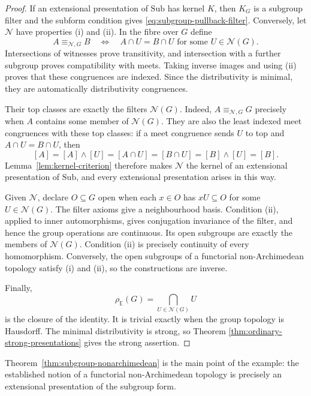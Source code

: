 \documentclass[12pt,oneside,reqno]{amsart}
\theoremstyle{definition}
\theoremstyle{remark}
\newcommand{\Sub}{\mathrm{Sub}}
\begin{document}
\begin{proof}
If an extensional presentation of \(\Sub\) has kernel \(K\), then
\(K_G\) is a subgroup filter and the subform condition gives
\eqref{eq:subgroup-pullback-filter}.  Conversely, let
\(\mathcal N\) have properties (i) and (ii).  In the fibre over \(G\)
define
\begin{equation}\label{eq:subgroup-local-relation}
 A\equiv_{\mathcal N,G}B
 \quad\Longleftrightarrow\quad
 A\cap U=B\cap U\text{ for some }U\in\mathcal N(G).
\end{equation}
Intersections of witnesses prove transitivity, and intersection with a
further subgroup proves compatibility with meets.  Taking inverse
images and using (ii) proves that these congruences are indexed.  Since
the distributivity is minimal, they are automatically distributivity
congruences.

Their top classes are exactly the filters \(\mathcal N(G)\).  Indeed,
\(A\equiv_{\mathcal N,G}G\) precisely when \(A\) contains some member
of \(\mathcal N(G)\).  They are also the least indexed meet
congruences with these top classes: if a meet congruence sends \(U\) to
top and \(A\cap U=B\cap U\), then
\[
 [A]=[A]\wedge[U]=[A\cap U]=[B\cap U]
      =[B]\wedge[U]=[B].
\]
Lemma~\ref{lem:kernel-criterion} therefore makes \(\mathcal N\) the
kernel of an extensional presentation of \(\Sub\), and every
extensional presentation arises in this way.

Given \(\mathcal N\), declare \(O\subseteq G\) open when each
\(x\in O\) has \(xU\subseteq O\) for some
\(U\in\mathcal N(G)\).  The filter axioms give a neighbourhood basis.
Condition (ii), applied to inner automorphisms, gives conjugation
invariance of the filter, and hence the group operations are
continuous.  Its open subgroups are exactly the members of
\(\mathcal N(G)\).  Condition (ii) is precisely continuity of every
homomorphism.  Conversely, the open subgroups of a functorial
non-Archimedean topology satisfy (i) and (ii), so the constructions are
inverse.

Finally,
\[
             \rho_{\mathbb E}(G)
                =\bigcap_{U\in\mathcal N(G)}U
\]
is the closure of the identity.  It is trivial exactly when the group
topology is Hausdorff.
The minimal distributivity is strong, so Theorem
\ref{thm:ordinary-strong-presentations} gives the strong assertion.
\end{proof}

Theorem~\ref{thm:subgroup-nonarchimedean} is the main point of the
example: the established notion of a functorial non-Archimedean
topology is precisely an extensional presentation of the subgroup form.
\end{document}

